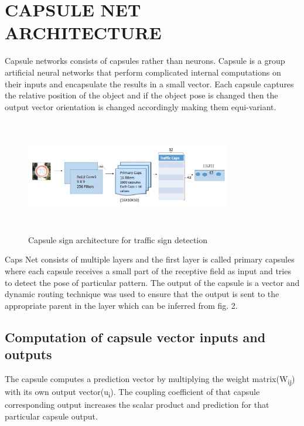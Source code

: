 \documentclass[letterpaper, 10 pt, conference]{ieeeconf}  %
\begin{document}
\section{CAPSULE NET ARCHITECTURE}
Capsule networks consists of capsules rather than neurons. Capsule\cite{xi2017capsule} is a group artificial neural networks that perform complicated internal computations on their inputs and encapsulate the results in a small vector. Each capsule captures the relative position of the object and if the object pose is changed then the output vector orientation is changed\cite{hinton2011transforming} accordingly making them equi-variant.
\begin{figure}[ht]
\includegraphics[width=9cm, height=5cm]{caps_architecture1}
\caption{Capsule sign architecture for traffic sign detection}
\end{figure}
\par Caps Net consists of multiple layers and the first layer is called primary capsules where each capsule receives a small part of the receptive field as input and tries to detect the pose of particular pattern. The output of the capsule is a vector and dynamic routing technique was used to ensure that the output is sent to the appropriate parent in the layer which can be inferred from fig. 2. 
\subsection{Computation of capsule vector inputs and outputs}The capsule computes a prediction vector\cite{wang2018optimization} by multiplying the weight matrix(W\textsubscript{ij}) with its own output vector(u\textsubscript{i}). The coupling coefficient of that capsule corresponding output increases the scalar product and prediction\cite{hinton1981parallel} for that particular capsule output.
\newline
\newline
\end{document}
